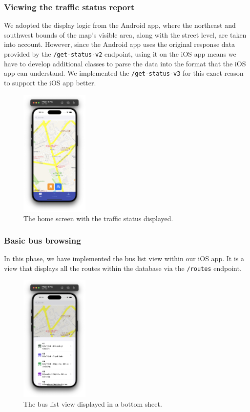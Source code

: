 \subsubsection{Viewing the traffic status report}
We adopted the display logic from the Android app, where the northeast and southwest bounds of the map's visible area, along with the street level, are taken into account. However, since the Android app uses the original response data provided by the \lstinline{/get-status-v2} endpoint, using it on the iOS app means we have to develop additional classes to parse the data into the format that the iOS app can understand. We implemented the \lstinline{/get-status-v3} for this exact reason to support the iOS app better.

\begin{figure}[H]
    \centering
    \includegraphics[width=0.3\textwidth]{assets/images/Implementation/traffic_status_view.png}
    \caption{The home screen with the traffic status displayed.}
    \label{fig:traffic_status_view}
\end{figure}

\subsubsection{Basic bus browsing}
In this phase, we have implemented the bus list view within our iOS app. It is a view that displays all the routes within the database via the \lstinline{/routes} endpoint. 
\begin{figure}[H]
    \centering
    \includegraphics[width=0.3\textwidth]{assets/images/Implementation/bus_view.png}
    \caption{The bus list view displayed in a bottom sheet.}
    \label{fig:bus_view_ios}
\end{figure}


